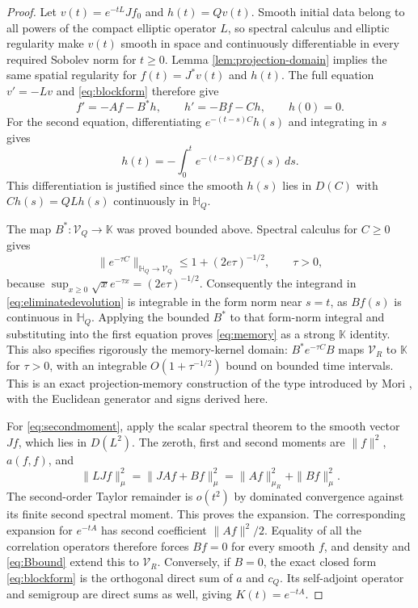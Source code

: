 \documentclass[11pt]{article}
\begin{document}
\begin{proof}
Let $v(t)=e^{-tL}Jf_0$ and $h(t)=Qv(t)$. Smooth initial data belong to
all powers of the compact elliptic operator $L$, so spectral calculus
and elliptic regularity make $v(t)$ smooth in space and continuously
differentiable in every required Sobolev norm for $t\geq0$. Lemma
\ref{lem:projection-domain} implies the same spatial regularity for
$f(t)=J^*v(t)$ and $h(t)$. The full equation $v'=-Lv$ and
\eqref{eq:blockform} therefore give
\[
 f'=-Af-B^*h,\qquad h'=-Bf-Ch,\qquad h(0)=0.
\]
For the second equation, differentiating
$e^{-(t-s)C}h(s)$ and integrating in $s$ gives
\begin{equation}\label{eq:eliminatedevolution}
 h(t)=-\int_0^te^{-(t-s)C}Bf(s)\,ds.
\end{equation}
This differentiation is justified since the smooth $h(s)$ lies in
$D(C)$ with $Ch(s)=QLh(s)$ continuously in $\mathbb H_Q$.

The map $B^*:\mathcal V_Q\to\mathbb K$ was proved bounded above.
Spectral calculus for $C\geq0$ gives
\[
 \|e^{-\tau C}\|_{\mathbb H_Q\to\mathcal V_Q}
 \leq1+(2e\tau)^{-1/2},\qquad\tau>0,
\]
because $\sup_{x\geq0}\sqrt{x}e^{-\tau x}=(2e\tau)^{-1/2}$.
Consequently the integrand in \eqref{eq:eliminatedevolution} is
integrable in the form norm near $s=t$, as $Bf(s)$ is continuous in
$\mathbb H_Q$. Applying the bounded $B^*$ to that form-norm integral
and substituting into the first equation proves \eqref{eq:memory}
as a strong $\mathbb K$ identity. This also specifies rigorously the
memory-kernel domain: $B^*e^{-\tau C}B$ maps $\mathcal V_R$ to
$\mathbb K$ for $\tau>0$, with an integrable $O(1+\tau^{-1/2})$
bound on bounded time intervals. This is an exact projection-memory
construction of the type introduced by Mori \cite{Mori}, with the
Euclidean generator and signs derived here.

For \eqref{eq:secondmoment}, apply the scalar spectral theorem to the
smooth vector $Jf$, which lies in $D(L^2)$. The zeroth, first and
second moments are $\|f\|^2$, $a(f,f)$, and
\[
 \|LJf\|_\mu^2=\|JAf+Bf\|_\mu^2=\|Af\|_{\mu_R}^2+\|Bf\|_\mu^2.
\]
The second-order Taylor remainder is $o(t^2)$ by dominated convergence
against its finite second spectral moment. This proves the expansion.
The corresponding expansion for $e^{-tA}$ has second coefficient
$\|Af\|^2/2$. Equality of all the correlation operators therefore
forces $Bf=0$ for every smooth $f$, and density and \eqref{eq:Bbound}
extend this to $\mathcal V_R$. Conversely, if $B=0$, the exact closed
form \eqref{eq:blockform} is the orthogonal direct sum of $a$ and $c_Q$.
Its self-adjoint operator and semigroup are direct sums as well, giving
$K(t)=e^{-tA}$.
\end{proof}
\end{document}
